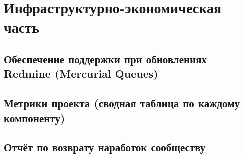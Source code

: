 \chapter{Инфраструктурно-экономическая часть}
\section{Обеспечение поддержки при обновлениях Redmine (Mercurial Queues)}
\section{Метрики проекта (сводная таблица по каждому компоненту)}
\section{Отчёт по возврату наработок сообществу}


